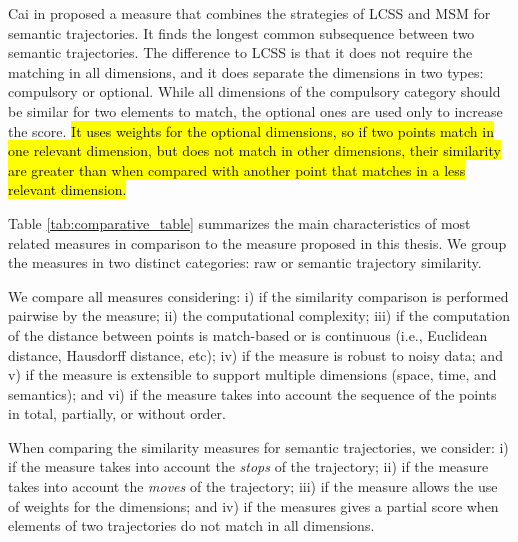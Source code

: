 Cai in \cite{CaiLee2016} proposed a measure that combines the strategies of LCSS \cite{vlachos2002discovering} and MSM\cite{Furtado:TGIS12156} for semantic trajectories. It finds the longest common subsequence between two semantic trajectories. The difference to LCSS is that it does not require the matching in all dimensions, and it does separate the dimensions in two types: compulsory or optional. While all dimensions of the compulsory category should be similar for two elements to match, the optional ones are used only to increase the score. \hl{It uses weights for the optional dimensions, so if two points match in one relevant dimension, but does not match in other dimensions, their similarity are greater than when compared with another point that matches in a less relevant dimension.}

Table {\ref{tab:comparative_table}} summarizes the main characteristics of most related measures in comparison to the measure proposed in this thesis. We group the measures in two distinct categories: raw or semantic trajectory similarity.

We compare all measures considering: i) if the similarity comparison is performed pairwise by the measure; ii) the computational complexity; iii) if the computation of the distance between points is match-based or is continuous (i.e., Euclidean distance, Hausdorff distance, etc); iv) if the measure is robust to noisy data; and v) if the measure is extensible to support multiple dimensions (space, time, and semantics); and vi) if the measure takes into account the sequence of the points in total, partially, or without order.

When comparing the similarity measures for semantic trajectories, we consider: i) if the measure takes into account the \emph{stops} of the trajectory; ii) if the measure takes into account the \emph{moves} of the trajectory; iii) if the measure allows the use of weights for the dimensions; and iv) if the measures gives a partial score when elements of two trajectories do not match in all dimensions.

